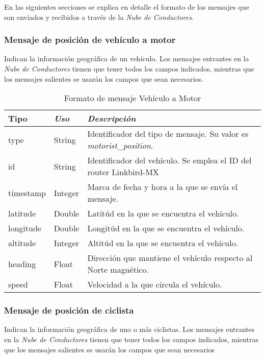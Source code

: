 En las siguientes secciones se explica en detalle el formato de los mensajes que son enviados y recibidos a través de la \emph{Nube de Conductores}.

\subsubsection{Mensaje de posición de vehículo a motor}\label{sssection:MensajePosVehMotor}
Indican la información geográfica de un vehículo. Los mensajes entrantes en la \emph{Nube de Conductores} tienen que tener todos los campos indicados, mientras que los mensajes salientes se usarán los campos que sean necesarios.

\begin{table}[h]
	\centering
	\caption{Formato de mensaje Vehículo a Motor}\label{tab:CamposMensajePosVehMotNubeConductores}
	\begin{tabular}{lll}
		\toprule
			\textbf{Tipo} & \emph{Uso} & \emph{Descripción}\\
		\midrule
			type		&	String	&	Identificador del tipo de mensaje. Su valor es \emph{motorist\_position}.	\\
			id		&	String	&	Identificador del vehículo. Se emplea el ID del router Linkbird-MX		\\
			timestamp	&	Integer	&	Marca de fecha y hora a la que se envía el mensaje.					\\
			latitude	&	Double	&	Latitúd en la que se encuentra el vehículo. 						\\
			longitude	&	Double	&	Longitúd en la que se encuentra el vehículo.						\\
			altitude	&	Integer	&	Altitúd en la que se encuentra el vehículo.						\\
			heading	&	Float		&	Dirección que mantiene el vehículo respecto al Norte magnético.		\\
			speed	&	Float		&	Velocidad a la que circula el vehículo.							\\					 
		\bottomrule
	\end{tabular}
\end{table}

\subsubsection{Mensaje de posición de ciclista}\label{sssection:MensajePosCiclista}
Indican la información geográfica de uno o más ciclistas. Los mensajes entrantes en la \emph{Nube de Conductores} tienen que tener todos los campos indicados, mientras que los mensajes salientes se usarán los campos que sean necesarios

